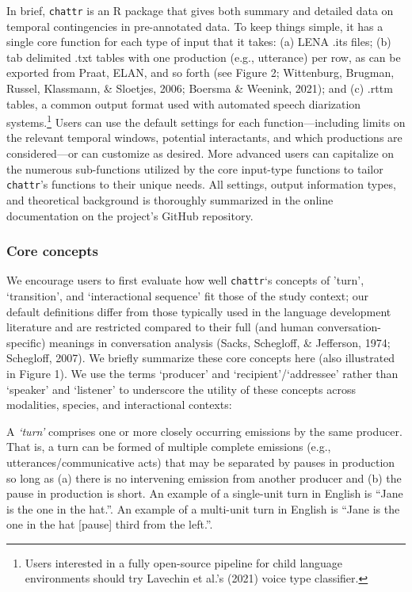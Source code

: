 \documentclass[10pt, letterpaper]{article}
\begin{document}
In brief, \texttt{chattr} is an R package that gives both summary and
detailed data on temporal contingencies in pre-annotated data. To keep
things simple, it has a single core function for each type of input that
it takes: (a) LENA .its files; (b) tab delimited .txt tables with one
production (e.g., utterance) per row, as can be exported from Praat,
ELAN, and so forth (see Figure 2; Wittenburg, Brugman, Russel,
Klassmann, \& Sloetjes, 2006; Boersma \& Weenink, 2021); and (c) .rttm
tables, a common output format used with automated speech diarization
systems.\footnote{Users interested in a fully open-source pipeline for
  child language environments should try Lavechin et al.'s (2021) voice
  type classifier.} Users can use the default settings for each
function---including limits on the relevant temporal windows, potential
interactants, and which productions are considered---or can customize as
desired. More advanced users can capitalize on the numerous
sub-functions utilized by the core input-type functions to tailor
\texttt{chattr}'s functions to their unique needs. All settings, output
information types, and theoretical background is thoroughly summarized
in the online documentation on the project's GitHub repository.

\hypertarget{core-concepts}{%
\subsubsection{Core concepts}\label{core-concepts}}

We encourage users to first evaluate how well \texttt{chattr}`s concepts
of 'turn', `transition', and `interactional sequence' fit those of the
study context; our default definitions differ from those typically used
in the language development literature and are restricted compared to
their full (and human conversation-specific) meanings in conversation
analysis (Sacks, Schegloff, \& Jefferson, 1974; Schegloff, 2007). We
briefly summarize these core concepts here (also illustrated in Figure
1). We use the terms `producer' and `recipient'/`addressee' rather than
`speaker' and `listener' to underscore the utility of these concepts
across modalities, species, and interactional contexts:

A \emph{`turn'} comprises one or more closely occurring emissions by the
same producer. That is, a turn can be formed of multiple complete
emissions (e.g., utterances/communicative acts) that may be separated by
pauses in production so long as (a) there is no intervening emission
from another producer and (b) the pause in production is short. An
example of a single-unit turn in English is ``Jane is the one in the
hat.''. An example of a multi-unit turn in English is ``Jane is the one
in the hat {[}pause{]} third from the left.''.
\end{document}
